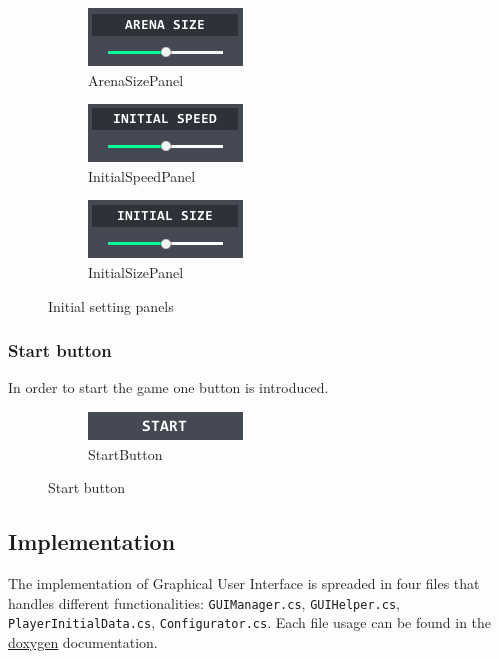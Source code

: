 \begin{figure}[!h]\centering
	\captionsetup{justification=centering}
	\begin{subfigure}{0.25\textwidth}
		\includegraphics{gui-imgs/arenasizepanel}
		\caption*{ArenaSizePanel}
	\end{subfigure}
	\begin{subfigure}{0.25\textwidth}
		\includegraphics{gui-imgs/initialspeedpanel}
		\caption*{InitialSpeedPanel}
	\end{subfigure}
	\begin{subfigure}{0.25\textwidth}
		\includegraphics{gui-imgs/initialsizepanel}
		\caption*{InitialSizePanel}
	\end{subfigure}
	\caption{Initial setting panels}
\end{figure}

\subsubsection{Start button}\label{gui-startbutton}
\noindent In order to start the game one button is introduced.

\begin{figure}[!h]\centering
	\begin{subfigure}{0.25\textwidth}
		\includegraphics{gui-imgs/startbutton}
		\caption*{StartButton}
	\end{subfigure}
	\caption{Start button}
\end{figure}

\subsection{Implementation}
\noindent The implementation of Graphical User Interface is spreaded in four files that handles different functionalities: \verb|GUIManager.cs|, \verb|GUIHelper.cs|, \verb|PlayerInitialData.cs|, \verb|Configurator.cs|. Each file usage can be found in the \href{run:../CodeDocumentation/code_documentation.pdf}{doxygen} documentation.\\

